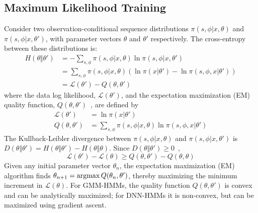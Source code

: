 \subsection{Maximum Likelihood Training}

Consider two observation-conditional sequence distributions
$\pi(s,\phi|x,\theta)$ and $\pi(s,\phi|x,\theta')$, with parameter
vectors $\theta$ and $\theta'$ respectively.  The cross-entropy
between these distributions is:
\begin{align}
  H\left(\theta\Vert\theta'\right) &=
  -\sum_{s,\phi} \pi(s,\phi|x,\theta)
  \ln \pi(s,\phi|x,\theta')\\
  &=   \sum_{s,\phi} \pi(s,\phi|x,\theta)
  \left(\ln \pi(x|\theta')-\ln \pi(s,\phi,x|\theta')\right)\\
  &=  {\mathcal L}\left(\theta'\right)-Q\left(\theta,\theta'\right)
  \label{eq:crossentropy}
\end{align}
where the data log likelihood, ${\mathcal L}\left(\theta'\right)$, and
the expectation maximization (EM) quality function,
$Q\left(\theta,\theta'\right)$~\cite{Dempster77}, are defined by
\begin{align}
  {\mathcal L}\left(\theta'\right) &= \ln \pi(x|\theta')
  \label{eq:loglikelihood}\\
  Q\left(\theta,\theta'\right)
  &=
  \sum_{s,\phi} \pi(s,\phi|x,\theta)\ln \pi(s,\phi,x|\theta')
   \label{eq:Qfunction}
\end{align}
The Kullback-Leibler divergence between $\pi(s,\phi|x,\theta)$ and
$\pi(s,\phi|x,\theta')$ is $D\left(\theta\Vert\theta'\right)=
H\left(\theta\Vert\theta'\right)-H\left(\theta\Vert\theta\right)$.
Since $D\left(\theta\Vert\theta'\right)\ge 0$~\cite{Shannon49},
\begin{equation}
  {\mathcal L}\left(\theta'\right)-{\mathcal L}\left(\theta\right)\ge
  Q\left(\theta,\theta'\right)-
  Q\left(\theta,\theta\right)
  \label{eq:LgeQ}
\end{equation}
Given any initial parameter vector $\theta_n$, the expectation
maximization (EM) algorithm finds $\theta_{n+1}=\operatorname*{argmax}
Q(\theta_n,\theta')$, thereby maximizing the minimum increment in
${\mathcal L}(\theta)$.  For GMM-HMMs, the quality function
$Q\left(\theta,\theta'\right)$ is convex and can be analytically
maximized; for DNN-HMMs it is non-convex, but can be maximized using
gradient ascent.

